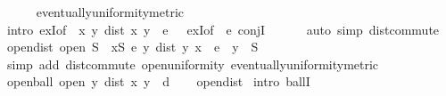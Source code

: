\begin{isabellebody}
\ \ \ \ \isamarkupfalse%
\ eventually{\isacharunderscore}{\kern0pt}uniformity{\isacharunderscore}{\kern0pt}metric\isanewline
\ \ \ \ \isamarkupfalse%
\ {\isacharparenleft}{\kern0pt}intro\ exI{\isacharbrackleft}{\kern0pt}of\ {\isacharunderscore}{\kern0pt}\ {\isachardoublequoteopen}{\isasymlambda}{\isacharparenleft}{\kern0pt}x{\isacharcomma}{\kern0pt}\ y{\isacharparenright}{\kern0pt}{\isachardot}{\kern0pt}\ dist\ x\ y\ {\isacharless}{\kern0pt}\ e\ {\isacharslash}{\kern0pt}\ {}{\isachardoublequoteclose}{\isacharbrackright}{\kern0pt}\ exI{\isacharbrackleft}{\kern0pt}of\ {\isacharunderscore}{\kern0pt}\ {\isachardoublequoteopen}e{\isacharslash}{\kern0pt}{}{\isachardoublequoteclose}{\isacharbrackright}{\kern0pt}\ conjI{\isacharparenright}{\kern0pt}\isanewline
\ \ \ \ \ \ {\isacharparenleft}{\kern0pt}auto\ simp{\isacharcolon}{\kern0pt}\ dist{\isacharunderscore}{\kern0pt}commute{\isacharparenright}{\kern0pt}\isanewline
{}\isamarkupfalse%
%
\endisatagproof
{\isafoldproof}%
%
\isadelimproof
\isanewline
%
\endisadelimproof
\isanewline
{}\isamarkupfalse%
\ open{\isacharunderscore}{\kern0pt}dist{\isacharcolon}{\kern0pt}\ {\isachardoublequoteopen}open\ S\ {\isasymlongleftrightarrow}\ {\isacharparenleft}{\kern0pt}{\isasymforall}x{\isasymin}S{\isachardot}{\kern0pt}\ {\isasymexists}e{\isachargreater}{\kern0pt}{}{\isachardot}{\kern0pt}\ {\isasymforall}y{\isachardot}{\kern0pt}\ dist\ y\ x\ {\isacharless}{\kern0pt}\ e\ {\isasymlongrightarrow}\ y\ {\isasymin}\ S{\isacharparenright}{\kern0pt}{\isachardoublequoteclose}\isanewline
%
\isadelimproof
\ \ %
\endisadelimproof
%
\isatagproof
{}\isamarkupfalse%
\ {\isacharparenleft}{\kern0pt}simp\ add{\isacharcolon}{\kern0pt}\ dist{\isacharunderscore}{\kern0pt}commute\ open{\isacharunderscore}{\kern0pt}uniformity\ eventually{\isacharunderscore}{\kern0pt}uniformity{\isacharunderscore}{\kern0pt}metric{\isacharparenright}{\kern0pt}%
\endisatagproof
{\isafoldproof}%
%
\isadelimproof
\isanewline
%
\endisadelimproof
\isanewline
{}\isamarkupfalse%
\ open{\isacharunderscore}{\kern0pt}ball{\isacharcolon}{\kern0pt}\ {\isachardoublequoteopen}open\ {\isacharbraceleft}{\kern0pt}y{\isachardot}{\kern0pt}\ dist\ x\ y\ {\isacharless}{\kern0pt}\ d{\isacharbraceright}{\kern0pt}{\isachardoublequoteclose}\isanewline
%
\isadelimproof
\ \ %
\endisadelimproof
%
\isatagproof
{}\isamarkupfalse%
\ open{\isacharunderscore}{\kern0pt}dist\isanewline
{}\isamarkupfalse%
\ {\isacharparenleft}{\kern0pt}intro\ ballI{\isacharparenright}{\kern0pt}\isanewline

\end{isabellebody}
